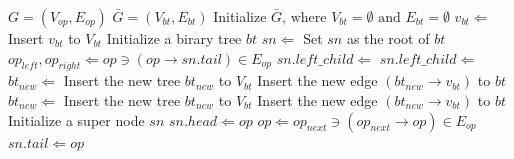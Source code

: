 \begin{algorithm}[ht!]    \caption{}
    \begin{algorithmic}[1]
        \Require    $G = ( V_{op} , E_{op} )$ 
        \Ensure     $\bar{G} = ( V_{bt} , E_{bt} )$ 
        \State      Initialize $\bar{G} \textrm{, where } V_{bt} = \emptyset \textrm{ and } E_{bt} = \emptyset $
          \label{line:forroots}   
        \State      $v_{bt} \Leftarrow $
        \State      Insert $v_{bt}$ to $V_{bt}$
        \EndFor                                                                    \label{line:forroote}
        \Statex %
                 \label{line:bbts}
        \State      Initialize a birary tree $bt$
        \State      $sn \Leftarrow$ 
        \State      Set $sn$ as the root of $bt$
        \State      {}
        \State      {}
        \EndFunction                                \label{line:bbte}
        \Statex %
                  \label{line:gbts}
             
        \State      $op_{left}, op_{right} \Leftarrow op \ni (op \rightarrow sn.tail) \in E_{op}$ 
          \label{line:deg}  \label{line:growifs}
        \State      $sn.left\_child \Leftarrow$ 
        \State      {}
        \State      $sn.left\_child \Leftarrow$ 
        \State      {}     \label{line:growife}
        \Else       \label{line:growelses}
        \State      $bt_{new} \Leftarrow$ 
        \State      Insert the new tree $bt_{new}$ to $V_{bt}$
        \State      Insert the new edge $(bt_{new} \rightarrow v_{bt})$ to $bt$
        \State      $bt_{new} \Leftarrow$ 
        \State      Insert the new tree $bt_{new}$ to $V_{bt}$
        \State      Insert the new edge $(bt_{new} \rightarrow v_{bt})$ to $bt$ \label{line:growelsee}
        \EndIf                          \label{line:gbte}
        \EndIf
        \EndFunction
        \Statex %
          \label{line:bsns}
        \State  Initialize a super node $sn$ 
        \State  $sn.head \Leftarrow op$
        \State   $op \Leftarrow op_{next} \ni (op_{next} \rightarrow op) \in E_{op}$ 
        \EndWhile
        \State  $sn.tail \Leftarrow op$
        \State      {}
        \EndFunction                        \label{line:bsne}
    \end{algorithmic}
    \label{alg:tohdfg}
\end{algorithm}


